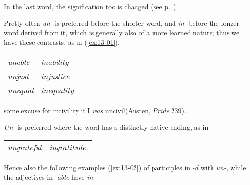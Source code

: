 \bigskip

In the last word, the signification too is changed (see p.~\pageref{meaning_change}).

Pretty often \textit{un-} is preferred before the shorter word, and \textit{in-} before the longer word derived from it, which is generally also of a more learned nature; thus we have these contrasts, as in  (\ref{ex:13-01}). %

\bigskip

\begin{tabular}{@{}ll@{}}
 \textit{unable}& \textit{inability}\\
 \textit{unjust}& \textit{injustice}\\
 \textit{unequal}& \textit{inequality}\\
\end{tabular}

\ea \label{ex:13-01} some excuse for incivility if I \textit{was} uncivil\hfill(\href{https://archive.org/details/prideprejudice00aust/page/238/mode/2up?q=%22some+excuse+for+incivility%22&view=theater}{Austen, \textit{Pride} 239}).
\z


\textit{Un-} is preferred where the word has a distinctly native ending, as in

\bigskip

\begin{tabular}{ll}
 \textit{ungrateful}& \textit{ingratitude}.\\
\end{tabular}

\bigskip

Hence also the following examples (\ref{ex:13-02}) of participles in \textit{-d} with \textit{un-}, while the adjectives in \textit{-able} have \textit{in-}.

